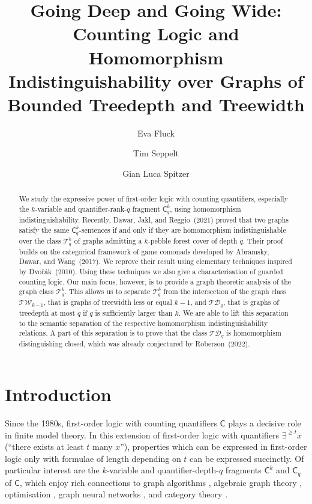 \documentclass[a4paper,UKenglish,cleveref, autoref, thm-restate]{lipics-v2021}
\title{Going Deep and Going Wide: Counting Logic and Homomorphism Indistinguishability over Graphs of Bounded Treedepth and Treewidth}
\author{Eva Fluck}{RWTH Aachen University, Germany}{fluck@cs.rwth-aachen.de}{https://orcid.org/0000-0002-9643-6081}{}
\author{Tim Seppelt}{RWTH Aachen University, Germany}{seppelt@cs.rwth-aachen.de}{https://orcid.org/0000-0002-6447-0568}{German Research Council (DFG) via Research Training Group 2236 (UnRAVeL)}
\author{Gian Luca Spitzer}{RWTH Aachen University, Germany}{gian.luca.spitzer@rwth-aachen.de}{https://orcid.org/0009-0008-0270-506X}{German Research Council (DFG) via Research Training Group 2236 (UnRAVeL)}
\begin{document}
\maketitle

\begin{abstract}
  We study the expressive power of first-order logic with counting quantifiers, especially the $k$-variable and quantifier-rank-$q$ fragment $\mathsf{C}^k_q$, using homomorphism indistinguishability. 
Recently, Dawar, Jakl, and Reggio~(2021) proved that two graphs satisfy the same $\mathsf{C}^k_q$-sentences if and only if they are homomorphism indistinguishable over the class $\mathcal{T}^k_q$ of graphs admitting a $k$-pebble forest cover of depth $q$. Their proof builds on the categorical framework of game comonads developed by Abramsky, Dawar, and Wang~(2017). We reprove their result using elementary techniques inspired by Dvo\v{r}ák~(2010). Using these techniques we also give a characterisation of guarded counting logic.
Our main focus, however, is to provide a graph theoretic analysis of the graph class $\mathcal{T}^k_q$. This allows us to separate $\mathcal{T}^k_q$ from the intersection of the graph class $\mathcal{TW}_{k-1}$, that is graphs of treewidth less or equal $k-1$, and $\mathcal{TD}_q$, that is graphs of treedepth at most $q$ if $q$ is sufficiently larger than $k$. We are able to lift this separation to the semantic separation of the respective homomorphism indistinguishability relations. A part of this separation is to prove that the class $\mathcal{TD}_q$ is homomorphism distinguishing closed, which was already conjectured by Roberson~(2022).

 \end{abstract}


\section{Introduction}

Since the 1980s, first-order logic with counting quantifiers $\mathsf{C}$ plays a decisive role in finite model theory.
In this extension of first-order logic with quantifiers $\exists^{\geq t} x$ (``there exists at least $t$ many $x$''), properties which can be expressed in first-order logic only with formulae of length depending on $t$ can be expressed succinctly.
Of particular interest are the $k$-variable and quantifier-depth-$q$ fragments $\mathsf{C}^k$ and $\mathsf{C}_q$ of $\mathsf{C}$, which
enjoy rich connections to graph algorithms \cite{dvorak_recognizing_2010}, algebraic graph theory \cite{dell_lovasz_2018,grohe_homomorphism_2022}, optimisation \cite{grohe_homomorphism_2022,roberson_lasserre_2023}, graph neural networks \cite{grohe_logic_2021}, and category theory \cite{dawar_lovasz-type_2021,abramsky_pebbling_2017}.
\end{document}
